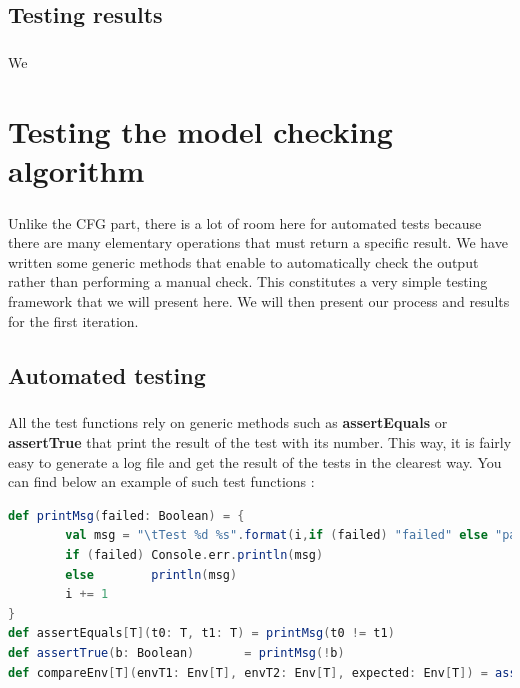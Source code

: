 \documentclass{report}
\begin{document}
\section{Testing results}

\paragraph{}
\hspace{4mm}We

\chapter{Testing the model checking algorithm}

\paragraph{}
\hspace{4mm}Unlike the CFG part, there is a lot of room here for automated tests because there are many elementary operations that must return a specific result. We have written some generic methods 
that enable to automatically check the output rather than performing a manual check. This constitutes a very simple 
testing framework that we will present here. We will then present our process and results for the first iteration.

\section{Automated testing}

\paragraph{}
\hspace{4mm}All the test functions rely on generic methods such as \textbf{assertEquals} or \textbf{assertTrue} that print
the result of the test with its number. This way, it is fairly easy to generate a log file and get the result of the tests
in the clearest way. You can find below an example of such test functions :

\begin{lstlisting}[language=scala
]
def printMsg(failed: Boolean) = { 
        val msg = "\tTest %d %s".format(i,if (failed) "failed" else "passed") 
        if (failed) Console.err.println(msg)
        else        println(msg)
        i += 1
}
def assertEquals[T](t0: T, t1: T) = printMsg(t0 != t1)
def assertTrue(b: Boolean)       = printMsg(!b)
def compareEnv[T](envT1: Env[T], envT2: Env[T], expected: Env[T]) = assertEquals(envT1 interEnv envT2,    def testNeg[T](env: Env[T], envs: Env[T]*)  = assertEquals(!env,Set(envs: _*))
\end{lstlisting}
\end{document}
